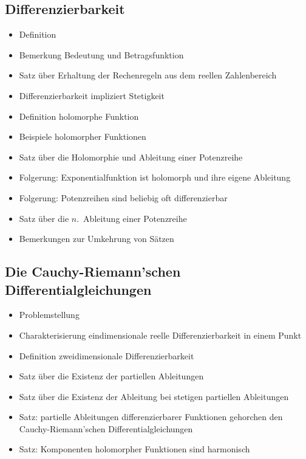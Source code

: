 \documentclass[8pt,a4paper,fleqn]{article}
\begin{document}
\begin{multicols}{2}
  \subsection{Differenzierbarkeit} %
  \label{sub:differenzierbarkeit}
  \begin{itemize}
    \item Definition
    \item Bemerkung Bedeutung und Betragsfunktion
    \item Satz über Erhaltung der Rechenregeln aus dem reellen Zahlenbereich
    \item Differenzierbarkeit impliziert Stetigkeit
    \item Definition holomorphe Funktion
    \item Beispiele holomorpher Funktionen
    \item Satz über die Holomorphie und Ableitung einer Potenzreihe
    \item Folgerung: Exponentialfunktion ist holomorph und ihre eigene Ableitung
    \item Folgerung: Potenzreihen sind beliebig oft differenzierbar
    \item Satz über die $n$.~Ableitung einer Potenzreihe
    \item Bemerkungen zur Umkehrung von Sätzen
  \end{itemize}

  \subsection{Die Cauchy-Riemann'schen Differentialgleichungen} %
  \label{sub:die_cauchy_riemann_schen_differentialgleichungen}
  \begin{itemize}
    \item Problemstellung
    \item Charakterisierung eindimensionale reelle Differenzierbarkeit in einem Punkt
    \item Definition zweidimensionale Differenzierbarkeit
    \item Satz über die Existenz der partiellen Ableitungen
    \item Satz über die Existenz der Ableitung bei stetigen partiellen Ableitungen
    \item Satz: partielle Ableitungen differenzierbarer Funktionen gehorchen den Cauchy-Riemann'schen Differentialgleichungen
    \item Satz: Komponenten holomorpher Funktionen sind harmonisch
  \end{itemize}


\end{multicols}
\end{document}
